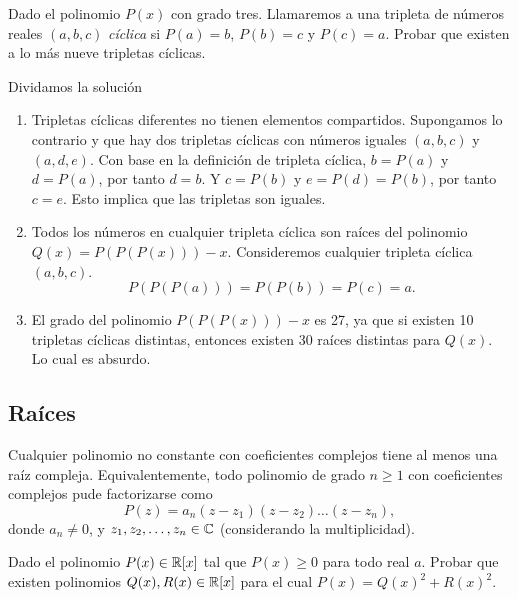 \begin{example}
    Dado el polinomio $P(x)$ con grado tres.
    Llamaremos a una tripleta de números reales $(a, b, c)$ \textit{cíclica} si $P(a) = b$, $P(b) = c$ y $P(c) = a$.
    Probar que existen a lo más nueve tripletas cíclicas.
\end{example}

\begin{solution}
    Dividamos la solución
    \begin{enumerate}
        \item Tripletas cíclicas diferentes no tienen elementos compartidos.
        Supongamos lo contrario y que hay dos tripletas cíclicas con números iguales $(a, b, c)$ y $(a, d, e)$.
        Con base en la definición de tripleta cíclica, $b = P(a)$ y $d = P(a)$, por tanto $d = b$.
        Y $c = P(b)$ y $e = P(d) = P(b)$, por tanto $c = e$.
        Esto implica que las tripletas son iguales.
        \item Todos los números en cualquier tripleta cíclica son raíces del polinomio $Q(x) = P(P(P(x))) - x$.
        Consideremos cualquier tripleta cíclica $(a, b, c)$.
        \[
            P(P(P(a))) = P(P(b)) = P(c) = a.
        \]
        \item El grado del polinomio $P(P(P(x))) - x$ es 27, ya que si existen 10 tripletas cíclicas distintas, entonces existen 30 raíces distintas para $Q(x)$.
        Lo cual es absurdo. \qedhere
    \end{enumerate}
\end{solution}

\subsection{Raíces}

\begin{theorem}
    Cualquier polinomio no constante con coeficientes complejos tiene al menos una raíz compleja.
    Equivalentemente, todo polinomio de grado $n \geq 1$ con coeficientes complejos pude factorizarse como
    \[
        P(z) = a_n (z - z_1)(z - z_2) \ldots (z - z_n),
    \]
    donde $a_n \neq 0$, y $z_1, z_2, \ldots, z_n \in \mathbb{C}$ (considerando la multiplicidad).
\end{theorem}

\begin{example}
    Dado el polinomio $P(x) \in \mathbb{R} [x]$ tal que $P(x) \geq 0$ para todo real $a$.
    Probar que existen polinomios $Q(x), R(x) \in \mathbb{R} [x]$ para el cual $P(x) = Q(x)^2 + R(x)^2$.
\end{example}


